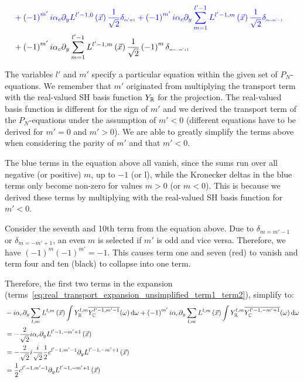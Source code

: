 \documentclass[10pt]{scrartcl}
\begin{document}
\begin{align*}
\\&
\mathcolor{blue}
{
+
\left({-1}\right)^{m'}i
}
\mathcolor{blue}
{
\alpha_c\partial_y
L^{l'-1,0}\left (\vec{x}\right)
\frac{1}{\sqrt{2}}
\delta_{\scaleto{m'=1}{4pt}}
}
\mathcolor{blue}
{
+
\left({-1}\right)^{m'}i
}
\mathcolor{blue}
{
\alpha_c\partial_y
\sum_{m=1}^{l'-1}L^{l'-1,m}\left (\vec{x}\right)
\frac{1}{\sqrt{2}}
\delta_{\scaleto{m=m'-1}{4pt}}
}
\\&
\mathcolor{black}
{
+
\left({-1}\right)^{m'}i
}
\mathcolor{black}
{
\alpha_c\partial_y
\sum_{m=1}^{l'-1}L^{l'-1,m}\left (\vec{x}\right)
\frac{1}{\sqrt{2}}
\left({-1}\right)^{m}
\delta_{\scaleto{m=-m'+1}{4pt}}
}
\end{align*}

The variables $l'$ and $m'$ specify a particular equation within the given set of $P_N$-equations. We remember that $m'$ originated from multiplying the transport term with the real-valued SH basis function $Y_{\mathbb{R}}$ for the projection. The real-valued basis function is different for the sign of $m'$ and we derived the transport term of the $P_N$-equations under the assumption of $m'<0$ (different equations have to be derived for $m'=0$ and $m'>0$). We are able to greatly simplify the terms above when considering the parity of $m'$ and that $m'<0$.

The blue terms in the equation above all vanish, since the sums run over all negative (or positive) $m$, up to $-1$ (or l), while the Kronecker deltas in the blue terms only become non-zero for values $m>0$ (or $m<0$). This is because we derived these terms by multiplying with the real-valued SH basis function for $m'<0$.

Consider the seventh and 10th term from the equation above. Due to $\delta_{m=m'-1}$ or $\delta_{m=-m'+1}$, an even $m$ is selected if $m'$ is odd and vice versa. Therefore, we have $(-1)^m(-1)^{m'}=-1$. This causes term one and seven (red) to vanish and term four and ten (black) to collapse into one term.

Therefore, the first two terms in the expansion (terms~\ref{eq:real_transport_expansion_unsimplified_term1_term2}), simplify to:
\begin{align*}
&-i\alpha_c\partial_y\sum_{l,m}L^{l,m}\left (\vec{x}\right)\int{Y_{\mathbb{R}}^{l,m}\overline{Y_{\mathbb{C}}^{l'-1, m'-1}}(\omega )\,\mathrm{d}\omega}
+\left({-1}\right)^{m'}i\alpha_c\partial_y\sum_{l,m}L^{l,m}\left (\vec{x}\right)\int{Y_{\mathbb{R}}^{l,m}\overline{Y_{\mathbb{C}}^{l'-1, -m'+1}}(\omega )\,\mathrm{d}\omega}
\\
&=-\frac{2}{\sqrt{2}}i
\alpha_c\partial_y
L^{l'-1,-m'+1}\left (\vec{x}\right)
\\
&=-\frac{2}{\sqrt{2}}i
\frac{i}{\sqrt{2}}\frac{1}{2}c^{{l'-1,m'-1}}
\partial_y
L^{l'-1,-m'+1}\left (\vec{x}\right)
\\
&=
\frac{1}{2}c^{{l'-1,m'-1}}
\partial_y
L^{l'-1,-m'+1}\left (\vec{x}\right)
\end{align*}
\end{document}
